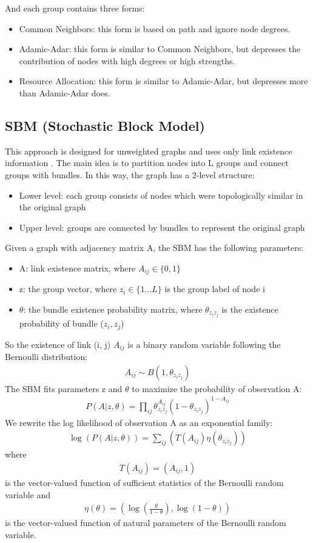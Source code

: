 \documentclass[conference]{IEEEtran}
\begin{document}
And each group contains three forms:
\begin{itemize}
	\item Common Neighbors: this form is based on path and ignore node degrees.
	\item Adamic-Adar: this form is similar to Common Neighbors,
	but depresses the contribution of nodes with high degrees or high strengths.
	\item Resource Allocation: this form is similar to Adamic-Adar,
	but depresses more than Adamic-Adar does.
\end{itemize}

\subsection{SBM (Stochastic Block Model)}
This approach is designed for unweighted graphs and uses only link existence information \cite{holland1983stochastic}.
The main idea is to partition nodes into L groups and connect groups with bundles.
In this way, the graph has a 2-level structure:
\begin{itemize}
	\item Lower level: each group consists of nodes which were topologically similar in the original graph
	\item Upper level: groups are connected by bundles
	to represent the original graph
\end{itemize}
Given a graph with adjacency matrix A, the SBM has the following parameters:
\begin{itemize}
	\item A: link existence matrix, where $ A_{ij} \in \{0, 1\} $
	\item z: the group vector,
	where $ z_i \in \{ 1 ... L \} $ is the group label of node i
	\item $ \theta $: the bundle existence probability matrix,
	where $ \theta_{z_i z_j} $ is the existence probability of bundle ($z_i, z_j$)
\end{itemize}
So the existence of link (i, j) $ A_{ij} $ is a binary random variable following the Bernoulli distribution:
\begin{align*}
	A_{ij} \sim B(1, \theta_{z_i z_j})
\end{align*}
The SBM fits parameters z and $ \theta $
to maximize the probability of observation A:
\begin{align*}
	P(A|z, \theta) 
	= \prod_{ij} \theta_{z_i z_j}^{A_{ij}}(1-\theta_{z_i z_j})^{1-A_{ij}}
\end{align*}
We rewrite the log likelihood of observation A as an exponential family:
\begin{align*}
	\log(P(A|z, \theta))
	= \sum_{ij} (
	T(A_{ij}) \eta(\theta_{z_i z_j})
	)
\end{align*}
where
\begin{align*}
	T(A_{ij}) = (A_{ij}, 1)
\end{align*}
is the vector-valued function of sufficient statistics of the Bernoulli random variable and
\begin{align*}
\eta(\theta) = ( \log(\frac{\theta}{1-\theta}), \log(1-\theta) )
\end{align*}
is the vector-valued function of natural parameters of the Bernoulli random variable.
\end{document}
